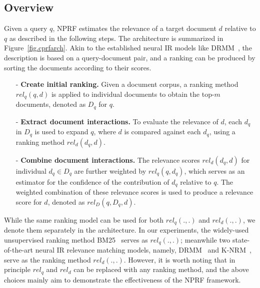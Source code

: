 \documentclass[11pt,a4paper]{article}
\begin{document}
\vspace{\vignore}
\subsection{Overview}\label{sec.methodoverview}
\vspace{\vignore}


Given a query $q$, NPRF estimates the relevance of a target document $d$ relative to $q$ as described in the following steps. The architecture is summarized in Figure~\ref{fig.cprfarch}.
Akin to the established neural IR models like DRMM~\cite{DBLP:conf/cikm/GuoFAC16},
the description is based on a query-document pair,
and a ranking can be produced by sorting the documents according to their scores. 


\begin{enumerate}[leftmargin=*]
\item[-]  
\noindent \textbf{Create initial ranking.} 
Given a document corpus,
a ranking method $\mathit{rel_q}(q, d)$ is applied to
individual documents to obtain the top-$m$ documents,
denoted as $D_q$ for $q$.

\item[-] 
\noindent \textbf{Extract document interactions.} To evaluate the 
relevance of $d$, 
each $d_q$ in $D_q$
is used to expand $q$, where $d$ is compared against
each $d_q$, using a ranking method $\mathit{rel_d}(d_q, d)$.

\item[-] 
\noindent \textbf{Combine document interactions.} The relevance scores $\mathit{rel}_{d}(d_q, d)$ for
individual $d_q\in D_q$ are further weighted by $\mathit{rel_q}(q, d_q)$, which serves as an estimator for  
the confidence of the contribution of $d_q$ relative to $q$.
The weighted combination of these relevance scores is used to produce
a relevance score for $d$, denoted as $\mathit{rel_D}(q, D_q, d)$.
\end{enumerate}


While the same ranking model can be used for both $\mathit{rel_q}(., .)$ and $\mathit{rel_d}(., .)$, we denote them separately in the architecture.
In our experiments, the widely-used unsupervised ranking method
BM25~\cite{DBLP:conf/trec/RobertsonWHGP95} serves as $\mathit{rel_q}(., .)$;
meanwhile
two state-of-the-art neural IR relevance matching models, namely,
DRMM~\cite{DBLP:conf/cikm/GuoFAC16} and K-NRM~\cite{DBLP:conf/sigir/XiongDCLP17},
serve as the ranking method $\mathit{rel_d}(., .)$.
However, it is worth noting that in principle
$\mathit{rel_q}$ and $\mathit{rel_d}$ can be replaced with any ranking method,
and the above choices mainly aim to demonstrate the effectiveness of the NPRF framework.
\end{document}

